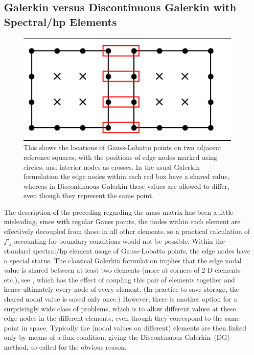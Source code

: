 \clearpage
\subsection{Galerkin versus Discontinuous Galerkin with Spectral/hp Elements}\label{sec:gvsdg}

\begin{figure}
\centerline{\includegraphics[width=12cm]{../pics/gaulob2d}}
\caption{This shows the locations of Gauss-Lobatto points
on two adjacent reference squares, with the positions of edge nodes
marked using circles, and interior nodes as crosses. In the
usual Galerkin formulation the edge nodes within each red box
have a shared value, whereas in Discontinuous Galerkin these values
are allowed to differ, even though they represent the same point.
\label{fig:gaulob2d}}
\end{figure}
The description of the preceding  regarding the
mass matrix has been a little misleading, since
with regular Gauss points, the nodes within each element are effectively decoupled
from those in all other elements, so a practical calculation of $f'_j$
accounting for boundary conditions would not be possible.
Within the standard spectral/hp element
usage of Gauss-Lobatto points, the edge nodes have a special status. The classical
Galerkin formulation implies that the edge nodal value is shared between
at least two elements (more at corners of 2-D elements etc.), see ,
which has the
effect of coupling this pair of elements together and hence ultimately every node of
every element. (In practice to save storage, the shared nodal value
is saved only once.) However, there is another
option for a surprisingly wide class of problems, which is to allow different
values at these edge nodes in the different elements, even though they correspond
to the same point in space. Typically the (nodal values on different) elements 
are then linked only by means of a flux
condition, giving the Discontinuous Galerkin~(DG) method, so-called for
the obvious reason. 

